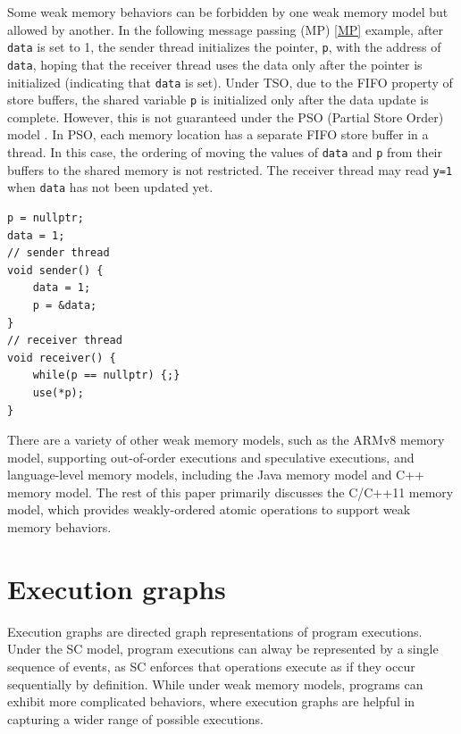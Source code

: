 Some weak memory behaviors can be forbidden by one weak memory model but allowed by another. In the following message passing (MP) \ref{MP} example, after \texttt{data} is set to 1, the sender thread initializes the pointer, \texttt{p}, with the address of \texttt{data}, hoping that the receiver thread uses the data only after the pointer is initialized (indicating that \texttt{data} is set). Under TSO, due to the FIFO property of store buffers, the shared variable \texttt{p} is initialized only after the data update is complete. However, this is not guaranteed under the PSO (Partial Store Order) model \cite{PSO}. In PSO, each memory location has a separate FIFO store buffer in a thread. In this case, the ordering of moving the values of \texttt{data} and \texttt{p} from their buffers to the shared memory is not restricted. The receiver thread may read \texttt{y=1} when \texttt{data} has not been updated yet.

\begin{lstlisting}[caption={Message Passing (MP) program}, label={MP}]
p = nullptr;
data = 1;
// sender thread
void sender() {
    data = 1;
    p = &data;
}
// receiver thread
void receiver() {
    while(p == nullptr) {;}
    use(*p);
}
\end{lstlisting}

There are a variety of other weak memory models, such as the ARMv8 \cite{ARMv8} memory model, supporting out-of-order executions and speculative executions, and language-level  memory models, including the Java memory model\cite{java} and C++ memory model. 
The rest of this paper primarily discusses the C/C++11 memory model\cite{c++model}, which provides weakly-ordered atomic operations to support weak memory behaviors. 



\section{Execution graphs}


Execution graphs\cite{herdingcats-exec-graph, exec-graph2, exec-graph3} are directed graph representations of program executions. Under the SC model, program executions can alway be represented by a single sequence of events, as SC enforces that operations execute as if they occur sequentially by definition. While under weak memory models, programs can exhibit more complicated behaviors, where execution graphs are helpful in capturing a wider range of possible executions. 

